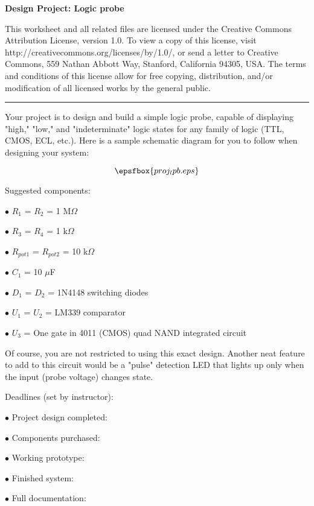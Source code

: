 
\centerline{\bf Design Project: Logic probe} \bigskip 
 
This worksheet and all related files are licensed under the Creative Commons Attribution License, version 1.0.  To view a copy of this license, visit http://creativecommons.org/licenses/by/1.0/, or send a letter to Creative Commons, 559 Nathan Abbott Way, Stanford, California 94305, USA.  The terms and conditions of this license allow for free copying, distribution, and/or modification of all licensed works by the general public.

\bigskip 

\hrule

\vskip 10pt

Your project is to design and build a simple logic probe, capable of displaying "high," "low," and "indeterminate" logic states for any family of logic (TTL, CMOS, ECL, etc.).  Here is a sample schematic diagram for you to follow when designing your system:

$$\epsfbox{proj_lpb.eps}$$

\medskip
\goodbreak
Suggested components:
\item{$\bullet$} $R_1$ = $R_2$ = 1 M$\Omega$
\item{$\bullet$} $R_3$ = $R_4$ = 1 k$\Omega$
\item{$\bullet$} $R_{pot1}$ = $R_{pot2}$ = 10 k$\Omega$
\item{$\bullet$} $C_1$ = 10 $\mu$F
\item{$\bullet$} $D_1$ = $D_2$ = 1N4148 switching diodes
\item{$\bullet$} $U_1$ = $U_2$ = LM339 comparator
\item{$\bullet$} $U_3$ = One gate in 4011 (CMOS) quad NAND integrated circuit
\medskip

Of course, you are not restricted to using this exact design.  Another neat feature to add to this circuit would be a "pulse" detection LED that lights up only when the input (probe voltage) changes state.

\vskip 10pt

\noindent
Deadlines (set by instructor):

\medskip
\item{$\bullet$} Project design completed: 
\item{$\bullet$} Components purchased:
\item{$\bullet$} Working prototype:
\item{$\bullet$} Finished system:
\item{$\bullet$} Full documentation:
\medskip



